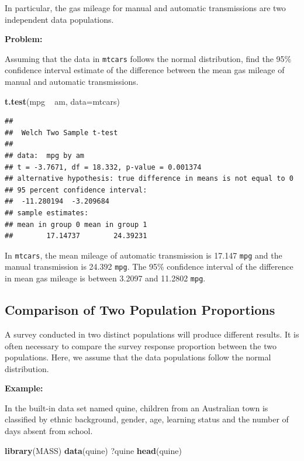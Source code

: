 \documentclass[]{article}
\newenvironment{Shaded}{\begin{snugshade}}{\end{snugshade}}
\newcommand{\KeywordTok}[1]{\textcolor[rgb]{0.13,0.29,0.53}{\textbf{{#1}}}}
\newcommand{\DataTypeTok}[1]{\textcolor[rgb]{0.13,0.29,0.53}{{#1}}}
\newcommand{\StringTok}[1]{\textcolor[rgb]{0.31,0.60,0.02}{{#1}}}
\newcommand{\NormalTok}[1]{{#1}}
\numberwithin{equation}{section}
\begin{document}
In particular, the gas mileage for manual and automatic transmissions
are two independent data populations.

\textbf{Problem:}

Assuming that the data in \texttt{mtcars} follows the normal
distribution, find the 95\% confidence interval estimate of the
difference between the mean gas mileage of manual and automatic
transmissions.

\begin{Shaded}
\begin{Highlighting}[]
\KeywordTok{t.test}\NormalTok{(mpg ~}\StringTok{ }\NormalTok{am, }\DataTypeTok{data=}\NormalTok{mtcars) }
\end{Highlighting}
\end{Shaded}

\begin{verbatim}
## 
##  Welch Two Sample t-test
## 
## data:  mpg by am
## t = -3.7671, df = 18.332, p-value = 0.001374
## alternative hypothesis: true difference in means is not equal to 0
## 95 percent confidence interval:
##  -11.280194  -3.209684
## sample estimates:
## mean in group 0 mean in group 1 
##        17.14737        24.39231
\end{verbatim}

In \texttt{mtcars}, the mean mileage of automatic transmission is 17.147
\texttt{mpg} and the manual transmission is 24.392 \texttt{mpg}. The
95\% confidence interval of the difference in mean gas mileage is
between 3.2097 and 11.2802 \texttt{mpg}.

\subsection{Comparison of Two Population
Proportions}\label{comparison-of-two-population-proportions}

A survey conducted in two distinct populations will produce different
results. It is often necessary to compare the survey response proportion
between the two populations. Here, we assume that the data populations
follow the normal distribution.

\textbf{Example:}

In the built-in data set named quine, children from an Australian town
is classified by ethnic background, gender, age, learning status and the
number of days absent from school.

\begin{Shaded}
\begin{Highlighting}[]
\KeywordTok{library}\NormalTok{(MASS)}
\KeywordTok{data}\NormalTok{(quine)}
\NormalTok{?quine}
\KeywordTok{head}\NormalTok{(quine)}
\end{Highlighting}
\end{Shaded}
\end{document}
